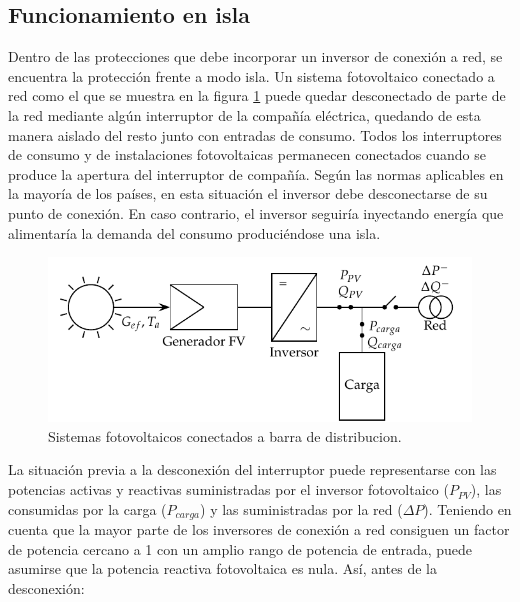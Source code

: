 \subsection{Funcionamiento en isla}

Dentro de las protecciones que debe incorporar un inversor de conexión
a red, se encuentra la protección frente a modo isla. Un sistema fotovoltaico
conectado a red como el que se muestra en la figura \ref{fig:SistemasConectados}
puede quedar desconectado de parte de la red mediante algún interruptor
de la compañía eléctrica, quedando de esta manera aislado del resto
junto con entradas de consumo. Todos los interruptores de consumo
y de instalaciones fotovoltaicas permanecen conectados cuando se produce
la apertura del interruptor de compañía. Según las normas aplicables
en la mayoría de los países, en esta situación el inversor debe desconectarse
de su punto de conexión. En caso contrario, el inversor seguiría inyectando
energía que alimentaría la demanda del consumo produciéndose una isla. 

%
\begin{figure}
\begin{centering}
\includegraphics{../figs/Isla}
\end{centering}

\caption{\label{fig:SistemasConectados}Sistemas fotovoltaicos conectados a
barra de distribucion.}

\end{figure}


La situación previa a la desconexión del interruptor puede representarse
con las potencias activas y reactivas suministradas por el inversor
fotovoltaico ($P_{PV}$), las consumidas por la carga ($P_{carga}$)
y las suministradas por la red ($\Delta P$). Teniendo en cuenta que
la mayor parte de los inversores de conexión a red consiguen un factor
de potencia cercano a 1 con un amplio rango de potencia de entrada,
puede asumirse que la potencia reactiva fotovoltaica es nula. Así,
antes de la desconexión:

